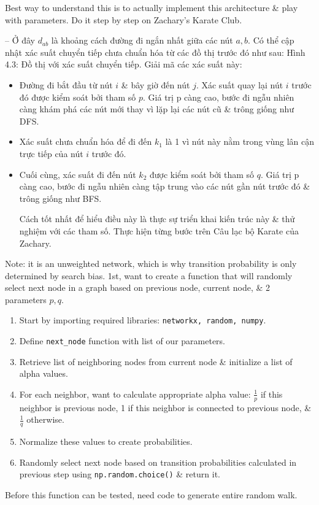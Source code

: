 \documentclass{article}
\begin{document}
\begin{itemize}
\begin{itemize}
\begin{itemize}
\begin{itemize}
                Best way to understand this is to actually implement this architecture \& play with parameters. Do it step by step on Zachary's Karate Club.
            \end{itemize}
            -- Ở đây $d_{ab}$ là khoảng cách đường đi ngắn nhất giữa các nút $a,b$. Có thể cập nhật xác suất chuyển tiếp chưa chuẩn hóa từ các đồ thị trước đó như sau: {\sf Hình 4.3: Đồ thị với xác suất chuyển tiếp}. Giải mã các xác suất này:
            \begin{itemize}
                \item Đường đi bắt đầu từ nút $i$ \& bây giờ đến nút $j$. Xác suất quay lại nút $i$ trước đó được kiểm soát bởi tham số $p$. Giá trị p càng cao, bước đi ngẫu nhiên càng khám phá các nút mới thay vì lặp lại các nút cũ \& trông giống như DFS.
                \item Xác suất chưa chuẩn hóa để đi đến $k_1$ là 1 vì nút này nằm trong vùng lân cận trực tiếp của nút $i$ trước đó.
                \item Cuối cùng, xác suất đi đến nút $k_2$ được kiểm soát bởi tham số $q$. Giá trị p càng cao, bước đi ngẫu nhiên càng tập trung vào các nút gần nút trước đó \& trông giống như BFS.

                Cách tốt nhất để hiểu điều này là thực sự triển khai kiến trúc này \& thử nghiệm với các tham số. Thực hiện từng bước trên Câu lạc bộ Karate của Zachary.
            \end{itemize}
            Note: it is an unweighted network, which is why transition probability is only determined by search bias. 1st, want to create a function that will randomly select next node in a graph based on previous node, current node, \& 2 parameters $p,q$.
            \begin{enumerate}
                \item Start by importing required libraries: {\tt networkx, random, numpy}.
                \item Define \verb|next_node| function with list of our parameters.
                \item Retrieve list of neighboring nodes from current node \& initialize a list of alpha values.
                \item For each neighbor, want to calculate appropriate alpha value: $\frac{1}{p}$ if this neighbor is previous node, 1 if this neighbor is connected to previous node, \& $\frac{1}{q}$ otherwise.
                \item Normalize these values to create probabilities.
                \item Randomly select next node based on transition probabilities calculated in previous step using {\tt np.random.choice()} \& return it.
            \end{enumerate}
            Before this function can be tested, need code to generate entire random walk.


\end{itemize}
\end{itemize}
\end{itemize}
\end{document}

